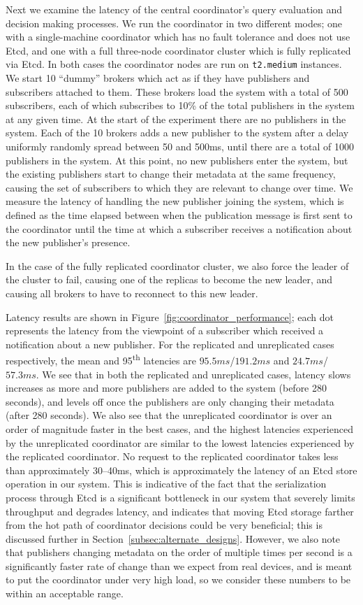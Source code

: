 Next we examine the latency of the central coordinator's query evaluation and decision making processes.
We run the coordinator in two different modes; one with a single-machine coordinator which has no fault tolerance and does not use Etcd, and one with a full three-node coordinator cluster which is fully replicated via Etcd.
In both cases the coordinator nodes are run on \texttt{t2.medium} instances.
We start 10 ``dummy'' brokers which act as if they have publishers and subscribers attached to them.
These brokers load the system with a total of 500 subscribers, each of which subscribes to 10\% of the total publishers in the system at any given time.
At the start of the experiment there are no publishers in the system.
Each of the 10 brokers adds a new publisher to the system after a delay uniformly randomly spread between 50 and 500ms, until there are a total of 1000 publishers in the system.
At this point, no new publishers enter the system, but the existing publishers start to change their metadata at the same frequency, causing the set of subscribers to which they are relevant to change over time.
We measure the latency of handling the new publisher joining the system, which is defined as the time elapsed between when the publication message is first sent to the coordinator until the time at which a subscriber receives a notification about the new publisher's presence.

In the case of the fully replicated coordinator cluster, we also force the leader of the cluster to fail, causing one of the replicas to become the new leader, and causing all brokers to have to reconnect to this new leader.

Latency results are shown in Figure~\ref{fig:coordinator_performance}; each dot represents the latency from the viewpoint of a subscriber which received a notification about a new publisher.
For the replicated and unreplicated cases respectively, the mean and 95\textsuperscript{th} latencies are $95.5ms$/$191.2ms$ and $24.7ms$/$57.3ms$.
We see that in both the replicated and unreplicated cases, latency slows increases as more and more publishers are added to the system (before 280 seconds), and levels off once the publishers are only changing their metadata (after 280 seconds).
We also see that the unreplicated coordinator is over an order of magnitude faster in the best cases, and the highest latencies experienced by the unreplicated coordinator are similar to the lowest latencies experienced by the replicated coordinator.
No request to the replicated coordinator takes less than approximately 30--40ms, which is approximately the latency of an Etcd store operation in our system.
This is indicative of the fact that the serialization process through Etcd is a significant bottleneck in our system that severely limits throughput and degrades latency, and indicates that moving Etcd storage farther from the hot path of coordinator decisions could be very beneficial; this is discussed further in Section~\ref{subsec:alternate_designs}.
However, we also note that publishers changing metadata on the order of multiple times per second is a significantly faster rate of change than we expect from real devices, and is meant to put the coordinator under very high load, so we consider these numbers to be within an acceptable range.

